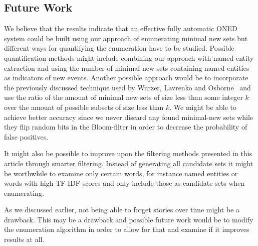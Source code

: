 \subsection{Future Work}
We believe that the results indicate that an effective fully automatic ONED system could be built using our approach of enumerating minimal new sets but different ways for quantifying the enumeration have to be studied. Possible quantification methods might include combining our approach with named entity extraction and using the number of minimal new sets containing named entities as indicators of new events. Another possible approach would be to incorporate the previously discussed technique used by Wurzer, Lavrenko and Osborne~\cite{wurzer2015kterm} and use the ratio of the amount of minimal new sets of size less than some integer $k$ over the amount of possible subsets of size less than $k$. We might be able to achieve better accuracy since we never discard any found minimal-new sets while they flip random bits in the Bloom-filter in order to decrease the probability of false positives.

It might also be possible to improve upon the filtering methods presented in this article through smarter filtering. Instead of generating all candidate sets it might be worthwhile to examine only certain words, for instance named entities or words with high TF-IDF scores and only include those as candidate sets when enumerating.

As we discussed earlier, not being able to forget stories over time might be a drawback. This may be a drawback and possible future work would be to modify the enumeration algorithm in order to allow for that and examine if it improves results at all.

